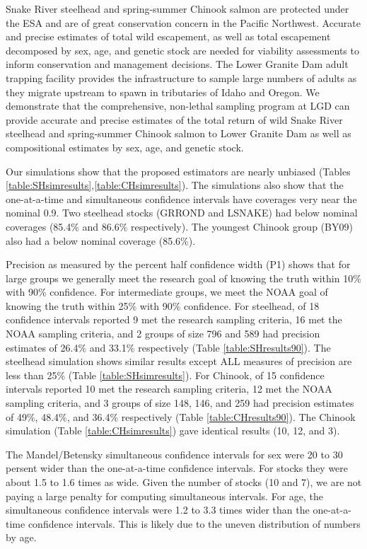 \documentclass[12pt]{article}
\begin{document}
Snake River steelhead and spring-summer Chinook salmon are protected under the ESA and are of great conservation concern in the Pacific Northwest. Accurate and precise estimates of total wild escapement, as well as total escapement decomposed by sex, age, and genetic stock are needed for viability assessments to inform conservation and management decisions. The Lower Granite Dam adult trapping facility provides the infrastructure to sample large numbers of adults as they migrate upstream to spawn in tributaries of Idaho and Oregon. We demonstrate that the comprehensive, non-lethal sampling program at LGD can provide accurate and precise estimates of the total return of wild Snake River steelhead and spring-summer Chinook salmon to Lower Granite Dam as well as compositional estimates by sex, age, and genetic stock.

Our simulations show that the proposed estimators are nearly unbiased (Tables \ref{table:SHsimresults},\ref{table:CHsimresults}).  The simulations also show that the one-at-a-time and simultaneous confidence intervals have coverages very near the nominal 0.9.  Two steelhead stocks (GRROND and LSNAKE) had below nominal coverages (85.4\% and 86.6\% respectively).  The youngest Chinook group (BY09) also had a below nominal coverage (85.6\%).

Precision as measured by the percent half confidence width (P1) shows that for large groups we generally meet the research goal of knowing the truth within 10\% with 90\% confidence.  For intermediate groups, we meet the NOAA goal of knowing the truth within 25\% with 90\% confidence.  For steelhead, of 18 confidence intervals reported 9 met the research sampling criteria, 16 met the NOAA sampling criteria, and 2 groups of size 796 and 589 had precision estimates of 26.4\% and 33.1\% respectively (Table \ref{table:SHresults90}). The steelhead simulation shows similar results except ALL measures of precision are less than 25\% (Table \ref{table:SHsimresults}). For Chinook, of 15 confidence intervals reported 10 met the research sampling criteria, 12 met the NOAA sampling criteria, and 3 groups of size 148, 146, and 259 had precision estimates of 49\%, 48.4\%, and 36.4\% respectively (Table \ref{table:CHresults90}).  The Chinook simulation (Table \ref{table:CHsimresults}) gave identical results (10, 12, and 3).

The Mandel/Betensky simultaneous confidence intervals for sex were 20 to 30 persent wider than the one-at-a-time confidence intervals.  For stocks they were about 1.5 to 1.6 times as wide.  Given the number of stocks (10 and 7), we are not paying a large penalty for computing simultaneous intervals.  For age, the simultaneous confidence intervals were 1.2 to 3.3 times wider than the one-at-a-time confidence intervals. This is likely due to the uneven distribution of numbers by age.
\end{document}
